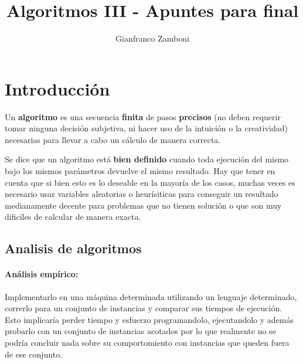 


\title{Algoritmos III - Apuntes para final}
\author{Gianfranco Zamboni}

\usepackage[backend=biber,style=chem-acs,sorting=none]{biblatex}
\nocite{*}




\setcounter{tocdepth}{3}
	

	\maketitle
	\tableofcontents

\newpage
\section{Introducción}
Un \textbf{algoritmo} es una secuencia \textbf{finita} de pasos  \textbf{precisos} (no deben requerir tomar ninguna decisión subjetiva, ni hacer uso de la intuición o la creatividad) necesarias para llevar a cabo un cálculo de manera correcta.

Se dice que un algoritmo está \textbf{bien definido} cuando toda ejecución del mismo bajo los mismos parámetros devuelve el mismo resultado. Hay que tener en cuenta que si bien esto es lo deseable en la mayoría de los casos, muchas veces es necesario usar variables aleatorias o heurísiticas para conseguir un resultado medianamente decente para problemas que no tienen solución o que son muy dificiles de calcular de manera exacta.

\subsection{Analisis de algoritmos}

\paragraph{Análisis empírico:} Implementarlo en una máquina determinada utilizando un lenguaje determinado, correrlo para un conjunto de instancias y comparar sus tiempos de ejecución. Esto implicaría perder tiempo y esfuerzo programandolo, ejecutandolo y además probarlo con un conjunto de instancias acotados por lo que realmente no se podría concluir nada sobre su comportomiento con instancias que queden fuera de ese conjunto.

